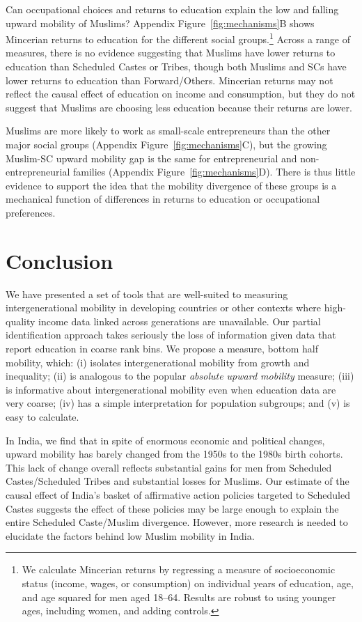 \documentclass[12pt,letterpaper]{article}
\numberwithin{equation}{section}
\begin{document}
Can occupational choices and returns to education explain the low and falling upward mobility of Muslims? Appendix Figure~\ref{fig:mechanisms}B shows Mincerian returns to education for the different social groups.\footnote{We calculate Mincerian returns by regressing a measure of socioeconomic status (income, wages, or consumption) on individual years of education, age, and age squared for men aged 18--64. Results are robust to using younger ages, including women, and adding  controls.} Across a range of measures, there is no evidence suggesting that Muslims have lower returns to education than Scheduled Castes or Tribes, though both Muslims and SCs have lower returns to education than Forward/Others. Mincerian returns may not reflect the causal effect of education on income and consumption, but they do not suggest that Muslims are choosing less education because their returns are lower.

Muslims are more likely to work as small-scale entrepreneurs than the other major social groups (Appendix Figure~\ref{fig:mechanisms}C), but the growing Muslim-SC upward mobility gap is the same for entrepreneurial and non-entrepreneurial families (Appendix Figure~\ref{fig:mechanisms}D). There is thus little evidence to support the idea that the mobility divergence of these groups is a mechanical function of differences in returns to education or occupational preferences.

\section{Conclusion}
\label{sec:conc}

We have presented a set of tools that are well-suited to measuring intergenerational mobility in developing countries or other contexts where high-quality income data linked across generations are unavailable. Our partial identification approach takes seriously the loss of information given data that report education in coarse rank bins. We propose a measure, bottom half mobility, which: (i) isolates intergenerational mobility from growth and inequality; (ii) is analogous to the popular \textit{absolute upward mobility} measure; (iii) is informative about intergenerational mobility even when education data are very coarse; (iv) has a simple interpretation for population subgroups; and (v) is easy to calculate. 

In India, we find that in spite of enormous economic and political changes, upward mobility has barely changed from the 1950s to the 1980s birth cohorts. This lack of change overall reflects substantial gains for men from Scheduled Castes/Scheduled Tribes and substantial losses for Muslims. Our estimate of the causal effect of India's basket of affirmative action policies targeted to Scheduled Castes suggests the effect of these policies may be large enough to explain the entire Scheduled Caste/Muslim divergence. However, more research is needed to elucidate the factors behind low Muslim mobility in India.
\end{document}
